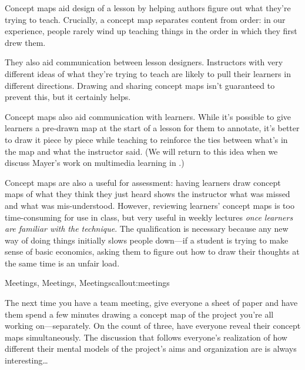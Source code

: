 \begin{genumerate}

\item
  Concept maps aid design of a lesson by helping authors figure out
  what they're trying to teach. Crucially, a concept map separates
  content from order: in our experience, people rarely wind up
  teaching things in the order in which they first drew them.

\item
  They also aid communication between lesson designers. Instructors
  with very different ideas of what they're trying to teach are likely
  to pull their learners in different directions. Drawing and sharing
  concept maps isn't guaranteed to prevent this, but it certainly
  helps.

\item
  Concept maps also aid communication with learners. While it's
  possible to give learners a pre-drawn map at the start of a lesson
  for them to annotate, it's better to draw it piece by piece while
  teaching to reinforce the ties between what's in the map and what
  the instructor said. (We will return to this idea when we discuss
  Mayer's work on multimedia learning in .)

\item
  Concept maps are also a useful for assessment: having learners draw
  concept maps of what they think they just heard shows the instructor
  what was missed and what was mis-understood.  However, reviewing
  learners' concept maps is too time-consuming for use in class, but
  very useful in weekly lectures \emph{once learners are familiar with
  the technique}.  The qualification is necessary because any new way
  of doing things initially slows people down---if a student is trying
  to make sense of basic economics, asking them to figure out how to
  draw their thoughts at the same time is an unfair load.

\end{genumerate}

\begin{callout}{Meetings, Meetings, Meetings}{callout:meetings}

The next time you have a team meeting, give everyone a sheet of paper
and have them spend a few minutes drawing a concept map of the project
you're all working on---separately. On the count of three, have
everyone reveal their concept maps simultaneously. The discussion that
follows everyone's realization of how different their mental models of
the project's aims and organization are is always interesting{\ldots}

\end{callout}

